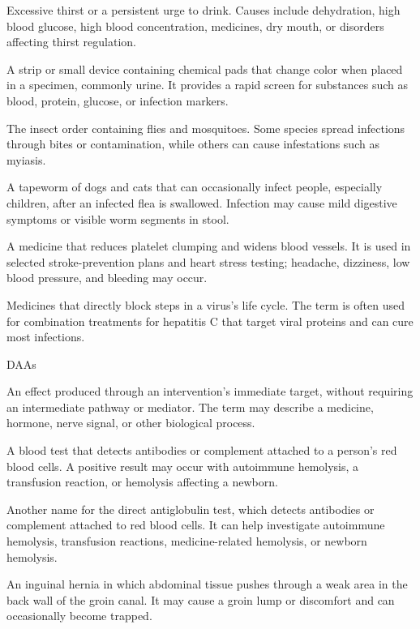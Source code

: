  Excessive thirst or a persistent urge to drink. Causes include dehydration, high blood glucose, high blood concentration, medicines, dry mouth, or disorders affecting thirst regulation.

 A strip or small device containing chemical pads that change color when placed in a specimen, commonly urine. It provides a rapid screen for substances such as blood, protein, glucose, or infection markers.

 The insect order containing flies and mosquitoes. Some species spread infections through bites or contamination, while others can cause infestations such as myiasis.

 A tapeworm of dogs and cats that can occasionally infect people, especially children, after an infected flea is swallowed. Infection may cause mild digestive symptoms or visible worm segments in stool.

 A medicine that reduces platelet clumping and widens blood vessels. It is used in selected stroke-prevention plans and heart stress testing; headache, dizziness, low blood pressure, and bleeding may occur.

 Medicines that directly block steps in a virus’s life cycle. The term is often used for combination treatments for hepatitis C that target viral proteins and can cure most infections.

\synonyms
DAAs

 An effect produced through an intervention’s immediate target, without requiring an intermediate pathway or mediator. The term may describe a medicine, hormone, nerve signal, or other biological process.

 A blood test that detects antibodies or complement attached to a person’s red blood cells. A positive result may occur with autoimmune hemolysis, a transfusion reaction, or hemolysis affecting a newborn.

 Another name for the direct antiglobulin test, which detects antibodies or complement attached to red blood cells. It can help investigate autoimmune hemolysis, transfusion reactions, medicine-related hemolysis, or newborn hemolysis.

 An inguinal hernia in which abdominal tissue pushes through a weak area in the back wall of the groin canal. It may cause a groin lump or discomfort and can occasionally become trapped.

